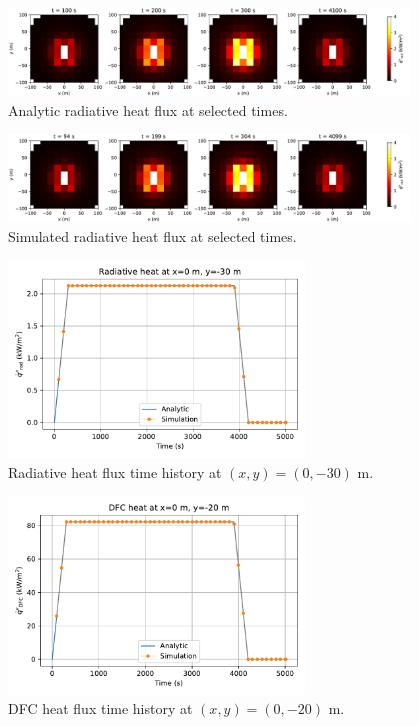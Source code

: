 \documentclass[../report/case_report.tex]{subfiles}
\begin{document}
\begin{figure}[h]
  \centering
  \includegraphics[width=0.95\textwidth]{../figures/rad_analytic_frames.pdf}
  \caption{Analytic radiative heat flux at selected times.}
  \label{fig:rad_analytic_frames}
\end{figure}

\begin{figure}[h]
  \centering
  \includegraphics[width=0.95\textwidth]{../figures/rad_sim_frames.pdf}
  \caption{Simulated radiative heat flux at selected times.}
  \label{fig:rad_sim_frames}
\end{figure}

\begin{figure}[h]
  \centering
  \includegraphics[width=0.7\textwidth]{../figures/rad_history_xy0_m30.pdf}
  \caption{Radiative heat flux time history at $(x,y)=(0,-30)$ m.}
  \label{fig:rad_history_xy0_m30}
\end{figure}

\begin{figure}[h]
  \centering
  \includegraphics[width=0.7\textwidth]{../figures/dfc_history_xy0_m20.pdf}
  \caption{DFC heat flux time history at $(x,y)=(0,-20)$ m.}
\label{fig:dfc_history_xy0_m20}
\end{figure}
\end{document}
